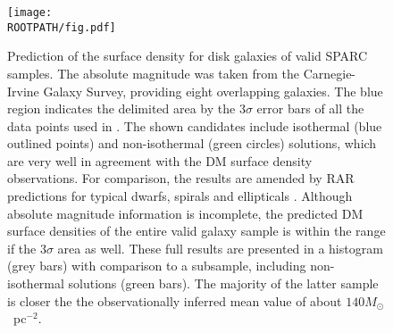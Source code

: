 \begin{figure}%
	\centering%
	\texttt{[image: \\ROOTPATH/fig.pdf]}
	\caption{Prediction of the surface density for disk galaxies of valid SPARC samples. The absolute magnitude was taken from the Carnegie-Irvine Galaxy Survey, providing eight overlapping galaxies. The blue region indicates the delimited area by the $3\sigma$ error bars of all the data points used in \citet{2009MNRAS.397.1169D}. The shown candidates include isothermal (blue outlined points) and non-isothermal (green circles) solutions, which are very well in agreement with the DM surface density observations. For comparison, the results are amended by RAR predictions for typical dwarfs, spirals and ellipticals \citep{RAR-II}. Although absolute magnitude information is incomplete, the predicted DM surface densities of the entire valid galaxy sample is within the range if the $3\sigma$ area as well. These full results are presented in a histogram (grey bars) with comparison to a subsample, including non-isothermal solutions (green bars). The majority of the latter sample is closer the the observationally inferred mean value of about $140 M_\odot$~pc$^{-2}$.}%
	\label{fig:SPARC:Donato}%
\end{figure}